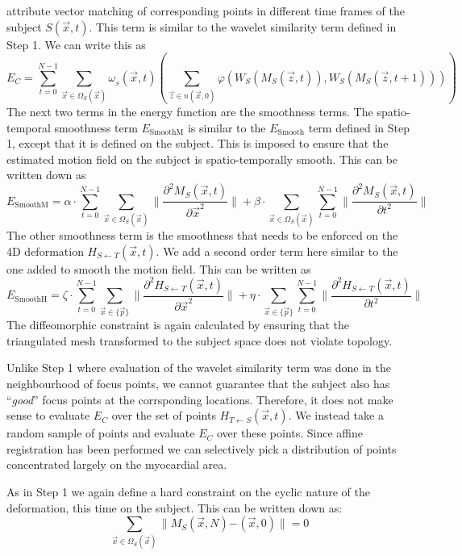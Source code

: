 \documentclass{article}
\newcommand{\tmop}[1]{\operatorname{#1}}
\newcommand{\tmem}[1]{{\em #1\/}}
\begin{document}
attribute vector matching of corresponding points in different time frames of
the subject $S ( \vec{x}, t )$. This term is similar to the wavelet similarity
term defined in Step 1. We can write this as
\[ E_C = \sum_{t = 0}^{N - 1} \sum_{\vec{x} \in \Omega_S ( \vec{x} )}
   \omega_{}_S ( \vec{x}, t ) \left( \sum_{\vec{z} \in n ( \vec{x}, 0 )}
   \varphi \left( W_S ( M_S ( \vec{z}, t ) ), W_S ( M_S ( \vec{z}, t + 1 ) )
   \right) \right) \]
The next two terms in the energy function are the smoothness terms. The
spatio-temporal smoothness term $E_{\tmop{SmoothM}}$ is similar to the
$E_{\tmop{Smooth}}$ term defined in Step 1, except that it is defined on the
subject. This is imposed to ensure that the estimated motion field on the
subject is spatio-temporally smooth. This can be written down as
\[ E_{\tmop{SmoothM}} = \alpha \cdot \sum_{t = 0}^{N - 1} \sum_{\vec{x} \in
   \Omega_S ( \vec{x} )} \| \frac{\partial^2 M_{_{} S} ( \vec{x}, t
   )}{\partial \vec{x}^2} \| + \beta \cdot \sum_{\vec{x} \in \Omega_S (
   \vec{x} )} \sum_{t = 0}^{N - 1} \| \frac{\partial^2 M_{_{} S} ( \vec{x}, t
   )}{\partial t^2} \| \]
The other smoothness term is the smoothness that needs to be enforced on the
4D deformation $H_{S \leftarrow T} ( \vec{x}, t )$. We add a second order term
here similar to the one added to smooth the motion field. This can be written
as
\[ E_{\tmop{SmoothH}} = \zeta \cdot \sum_{t = 0}^{N - 1} \sum_{\vec{x} \in \{
   \vec{p} \}} \| \frac{\partial^2 H_{S \leftarrow_{} T} ( \vec{x}, t
   )}{\partial \vec{x}^2} \| + \eta \cdot \sum_{\vec{x} \in \{ \vec{p} \}}
   \sum_{t = 0}^{N - 1} \| \frac{\partial^2 H_{S \leftarrow_{} T} ( \vec{x}, t
   )}{\partial t^2} \| \]
The diffeomorphic constraint is again calculated by ensuring that the
triangulated mesh transformed to the subject space does not violate topology.

Unlike Step 1 where evaluation of the wavelet similarity term was done in the
neighbourhood of focus points, we cannot guarantee that the subject also has
``{\tmem{good}}'' focus points at the corrsponding locations. Therefore, it
does not make sense to evaluate $E_C$ over the set of points $H_{T \leftarrow
S} ( \vec{x}, t )$. We instead take a random sample of points and evaluate
$E_C$ over these points. Since affine registration has been performed we can
selectively pick a distribution of points concentrated largely on the
myocardial area.

As in Step 1 we again define a hard constraint on the cyclic nature of the
deformation, this time on the subject. This can be written down as:
\[ \text{$\text{$\sum_{\vec{x} \in \Omega_S ( \vec{x} )} \| M_S ( \vec{x}, N )
   -_{} ( \vec{x}, 0 ) \| = 0$}$} \]
\end{document}
